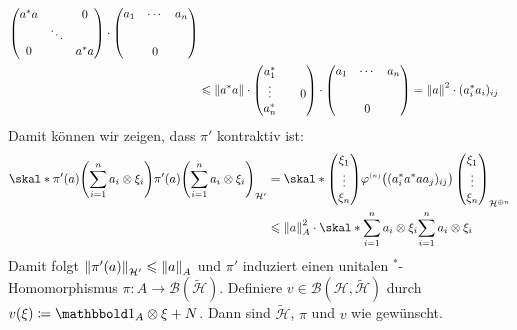 \begin{beweis}
\begin{align}
\begin{pmatrix}
			a^*a & & 0 \\
			& \ddots & \\
			0 & & a^*a
		\end{pmatrix} \cdot \begin{pmatrix}
			a_1 & \cdots & a_n \\
			& \rule{0cm}{1.6em} & \\
			& 0 & 
		\end{pmatrix} \\
		&\le \norm*{a^*a} \cdot \begin{pmatrix}
			a_1^* & & \\
			\vdots & & 0 \\
			a_n^* & & 
		\end{pmatrix} \cdot \begin{pmatrix}
			a_1 & \cdots & a_n \\
			& \rule{0cm}{1.6em} & \\
			& 0 & 
		\end{pmatrix} = \norm*{a}^2 \cdot (a_i^*a_i)_{ij}
	\end{align}
	Damit können wir zeigen, dass $\pi'$ kontraktiv ist:
	\begin{align}
		\skal*{\pi'(a) \enbrace*{\sum_{i=1}^{n} a_i \otimes \xi_i}}{\pi'(a) \enbrace*{\sum_{i=1}^{n} a_i \otimes \xi_i}}_{\mathcal{H}'} &= \skal*{\begin{pmatrix} \xi_1 \\ \vdots \\ \xi_n \end{pmatrix}}{\varphi^\ssbrace{n} \enbrace[\big]{(a_i^*a^*a a_j)_{ij}}\begin{pmatrix} \xi_1 \\ \vdots \\ \xi_n \end{pmatrix}}_{\mathcal{H}^{\oplus n}} \\
		&\le \norm*{a}^2_A \cdot \skal*{\sum_{i=1}^{n} a_i \otimes \xi_i}{\sum_{i=1}^{n} a_i \otimes \xi_i}
	\end{align}
	Damit folgt $\norm*{\pi'(a)}_{\mathcal{H}'} \le \norm*{a}_A$ und $\pi'$ induziert einen unitalen $^*$-Homomorphismus $\pi \colon A \to \mathcal{B}(\tilde{\mathcal{H}})$.
	Definiere $v \in \mathcal{B}(\mathcal{H},\tilde{\mathcal{H}})$ durch $v(\xi) \coloneqq \ind_A \otimes \xi + N$.
	Dann sind $\tilde{\mathcal{H}}$, $\pi$ und $v$ wie gewünscht.
\end{beweis}


